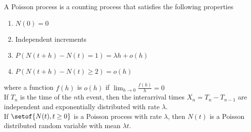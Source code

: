 \documentclass[answers,12pt,addpoints]{exam}
\begin{document}
\begin{definition}
    A Poisson process is a counting process that satisfies the following properties
    \begin{enumerate}
        \item $N(0) = 0$
        \item Independent increments
        \item $P(N(t+h) - N(t) = 1) = \lambda h + o(h)$
        \item $P(N(t+h) - N(t) \geq 2) = o(h)$
    \end{enumerate}
    where a function $f(h)$ is $o(h)$ if $\lim_{h \to 0} \frac{f(h)}{h} = 0$\\
    If $T_n$ is the time of the $n$th event, then the interarrival times $X_n = T_n - T_{n-1}$ are independent and exponentially distributed with rate $\lambda$.\\
    If $\setof{N(t), t \geq 0}$ is a Poisson process with rate $\lambda$, then $N(t)$ is a Poisson distributed random variable with mean $\lambda t$.
\end{definition}
\end{document}
